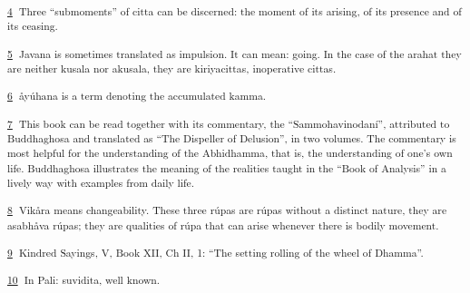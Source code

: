 \hypertarget{sdfootnote4}{}
\textsuperscript{\protect\hyperlink{sdfootnote4anc}{4} \textdutch{Three
``submoments'' of citta can be discerned: the moment of its arising, of
its presence and of its ceasing. }}

\hypertarget{sdfootnote5}{}
\textsuperscript{\protect\hyperlink{sdfootnote5anc}{5}
\textdutch{Javana is sometimes translated as impulsion. It can mean:
going. In the case of the arahat they are neither kusala nor akusala,
they are kiriyacittas, inoperative cittas. }}

\hypertarget{sdfootnote6}{}
\textsuperscript{\protect\hyperlink{sdfootnote6anc}{6}
\textdutch{åyúhana is a term denoting the accumulated kamma. }}

\hypertarget{sdfootnote7}{}
\textsuperscript{\protect\hyperlink{sdfootnote7anc}{7}
\textenglish[variant=american]{This book can be read together with its
commentary, the
}``\textenglish[variant=american]{Sammohavinodan}í''\textenglish[variant=american]{,
attributed to Buddhaghosa and translated as
}``\textenglish[variant=american]{The Dispeller of
Delusion}''\textenglish[variant=american]{, in two volumes. The
commentary is most helpful for the understanding of the Abhidhamma, that
is, the understanding of one}'\textenglish[variant=american]{s own life.
Buddhaghosa illustrates the meaning of the realities taught in the
}``\textenglish[variant=american]{Book of Analysis}''
\textenglish[variant=american]{in a lively way with examples from daily
life. }}

\hypertarget{sdfootnote8}{}
\textsuperscript{\protect\hyperlink{sdfootnote8anc}{8}\textdutch{
Vikåra means changeability. }\textenglish[variant=american]{These three
r}ú\textenglish[variant=american]{pas are
r}ú\textenglish[variant=american]{pas without a distinct nature,
}\textdutch{they are }\textgerman{asabh}\textdanish{å}va
rú\textenglish[variant=american]{pas; they are qualities of
r}úpa\textdutch{ that can arise whenever there is bodily movement. }}

\hypertarget{sdfootnote9}{}
\textsuperscript{\protect\hyperlink{sdfootnote9anc}{9}\textdutch{
Kindred Sayings, V, Book XII, Ch II, 1: ``The setting rolling of the
wheel of Dhamma''.}}

\hypertarget{sdfootnote10}{}
\textsuperscript{\protect\hyperlink{sdfootnote10anc}{10} \textdutch{In
Pali: suvidita, well known. }}
